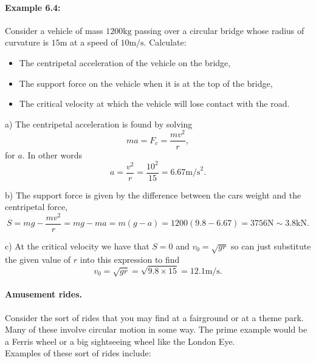 \paragraph{Example 6.4:} Consider a vehicle of mass $1200\text{kg}$ passing over a circular bridge whose radius of curvature is $15\text{m}$ at a speed of $10\text{m/s}$. Calculate:
\begin{itemize}
\setlength{\itemsep}{-5pt}
    \item[a)] The centripetal acceleration of the vehicle on the bridge,
    \item[b)] The support force on the vehicle when it is at the top of the bridge,
    \item[c)] The critical velocity at which the vehicle will lose contact with the road.
\end{itemize} 


a) The centripetal acceleration is found by solving 
\begin{equation*}
ma=F_{c}=\frac{mv^{2}}{r},
\end{equation*}
for $a$. In other words
\begin{equation*}
a=\frac{v^{2}}{r}=\frac{10^{2}}{15}=6.67\text{m/s}^{2}.
\end{equation*}

b) The support force is given by the difference between the cars weight and the centripetal force,
\begin{equation*}
S=mg-\frac{mv^{2}}{r}=mg-ma=m\left(g-a\right)=1200\left(9.8-6.67\right)=3756\text{N}\sim 3.8\text{kN}.
\end{equation*}

c) At the critical velocity we have that $S=0$ and $v_{0}=\sqrt{gr}$ so can just substitute the given value of $r$ into this expression to find
\begin{equation*}
v_{0}=\sqrt{gr}=\sqrt{9.8\times 15}=12.1\text{m/s}.
\end{equation*}


\paragraph{Amusement rides.} Consider the sort of rides that you may find at a fairground or at a theme park. Many of these involve circular motion in some way. The prime example would be a Ferris wheel or a big sightseeing wheel like the London Eye.\\

Examples of these sort of rides include: 

